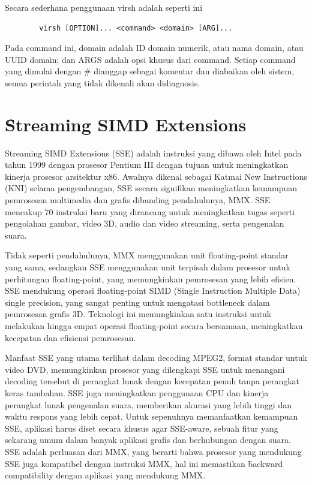 Secara sederhana penggunaan virsh adalah seperti ini
\begin{center}
	\begin{verbatim}
		virsh [OPTION]... <command> <domain> [ARG]...
	\end{verbatim}
\end{center}

Pada command ini, domain adalah ID domain numerik, atau nama domain, atau UUID domain; dan ARGS adalah opsi khusus dari command. Setiap command yang dimulai dengan \# dianggap sebagai komentar dan diabaikan oleh sistem, semua perintah yang tidak dikenali akan didiagnosis.

\section{\f{Streaming SIMD Extensions}}
Streaming SIMD Extensions (SSE) adalah instruksi yang dibawa oleh Intel pada tahun 1999 dengan prosesor Pentium III dengan tujuan untuk meningkatkan kinerja prosesor arsitektur x86. Awalnya dikenal sebagai Katmai New Instructions (KNI) selama pengembangan, SSE secara signifikan meningkatkan kemampuan pemrosesan multimedia dan grafis dibanding pendahulunya, MMX. SSE mencakup 70 instruksi baru yang dirancang untuk meningkatkan tugas seperti pengolahan gambar, video 3D, audio dan video streaming, serta pengenalan suara\cite{informitStreamingSIMD}.

Tidak seperti pendahulunya, MMX menggunakan unit floating-point standar yang sama, sedangkan SSE menggunakan unit terpisah dalam prosesor untuk perhitungan floating-point, yang memungkinkan pemrosesan yang lebih efisien. SSE mendukung operasi floating-point SIMD (Single Instruction Multiple Data) single precision, yang sangat penting untuk mengatasi bottleneck dalam pemrosesan grafis 3D. Teknologi ini memungkinkan satu instruksi untuk melakukan hingga empat operasi floating-point secara bersamaan, meningkatkan kecepatan dan efisiensi pemrosesan\cite{informitStreamingSIMD}.

Manfaat SSE yang utama terlihat dalam decoding MPEG2, format standar untuk video DVD, memungkinkan prosesor yang dilengkapi SSE untuk menangani decoding tersebut di perangkat lunak dengan kecepatan penuh tanpa perangkat keras tambahan. SSE juga meningkatkan penggunaan CPU dan kinerja perangkat lunak pengenalan suara, memberikan akurasi yang lebih tinggi dan waktu respons yang lebih cepat. Untuk sepenuhnya memanfaatkan kemampuan SSE, aplikasi harus diset secara khusus agar SSE-aware, sebuah fitur yang sekarang umum dalam banyak aplikasi grafis dan berhubungan dengan suara. SSE adalah perluasan dari MMX, yang berarti bahwa prosesor yang mendukung SSE juga kompatibel dengan instruksi MMX, hal ini memastikan \f{backward compatibility} dengan aplikasi yang mendukung MMX\cite{informitStreamingSIMD}.

